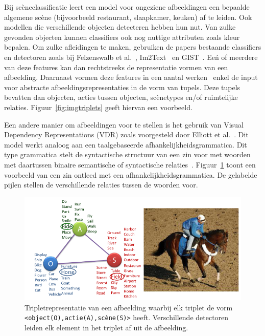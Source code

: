 Bij sc\`eneclassificatie leert een model voor ongeziene afbeeldingen een bepaalde algemene sc\`ene (bijvoorbeeld restaurant, slaapkamer, keuken) af te leiden. Ook modellen die verschillende objecten detecteren hebben hun nut. Van zulke gevonden objecten kunnen classifiers ook nog nuttige attributen zoals kleur bepalen. Om zulke afleidingen te maken, gebruiken de papers bestaande classifiers en detectoren zoals bij Felzenswalb et al.~\cite{Felzenszwalb2008}, Im2Text~\cite{Ordonez2011} en GIST~\cite{Oliva2006}. Ee\'n of meerdere van deze features kan dan rechtstreeks de representatie vormen van een afbeelding. Daarnaast vormen deze features in een aantal werken~\cite{Farhadi2010,Li2011,Mitchell2012,Yang2011} enkel de input voor abstracte afbeeldingsrepresentaties in de vorm van tupels. Deze tupels bevatten dan objecten, acties tussen objecten, sc\`enetypes en/of ruimtelijke relaties. Figuur~\ref{fig:imgtriplets} geeft hiervan een voorbeeld.



Een andere manier om afbeeldingen voor te stellen is het gebruik van Visual Dependency Representations (VDR) zoals voorgesteld door Elliott et al.~\cite{Elliott2013}. Dit model werkt analoog aan een taalgebaseerde afhankelijkheidsgrammatica. Dit type grammatica stelt de syntactische structuur van een zin voor met woorden met daartussen binaire semantische of syntactische relaties~\cite{Jurafsky:2009:SLP:1214993}. Figuur~\ref{fig:dep_grammar} toont een voorbeeld van een zin ontleed met een afhankelijkheidsgrammatica. De gelabelde pijlen stellen de verschillende relaties tussen de woorden voor.

\begin{figure}[tb]
      \centering
      \includegraphics[width=\linewidth]{Images/imgtriples.PNG}
      \caption{Tripletrepresentatie van een afbeelding waarbij elk triplet de vorm \texttt{<object(O),actie(A),sc\`ene(S)>} heeft. Verschillende detectoren leiden elk element in het triplet af uit de afbeelding.~\cite{Farhadi2010}}
      \label{fig:dep_grammar}
  \end{figure}  

